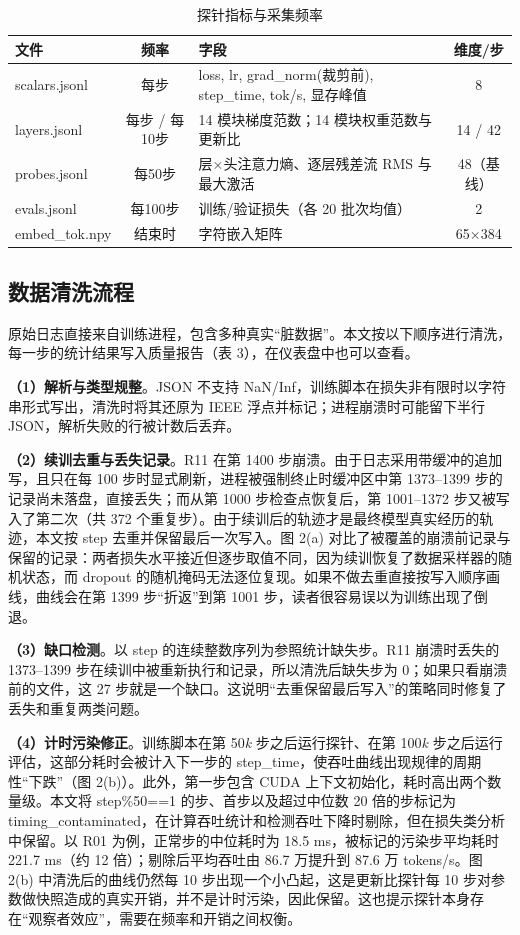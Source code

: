 \begin{table}[htbp]
\centering
\caption{探针指标与采集频率}
\small
\begin{tabularx}{\linewidth}{XcXc}
\toprule
\textbf{文件} & \textbf{频率} & \textbf{字段} & \textbf{维度/步} \\
\midrule
scalars.jsonl & 每步 & loss, lr, grad\_norm(裁剪前), step\_time, tok/s, 显存峰值 & 8 \\
layers.jsonl & 每步 / 每10步 & 14 模块梯度范数；14 模块权重范数与更新比 & 14 / 42 \\
probes.jsonl & 每50步 & 层$\times$头注意力熵、逐层残差流 RMS 与最大激活 & 48（基线） \\
evals.jsonl & 每100步 & 训练/验证损失（各 20 批次均值） & 2 \\
embed\_tok.npy & 结束时 & 字符嵌入矩阵 & 65$\times$384 \\
\bottomrule
\end{tabularx}
\end{table}

\subsection{数据清洗流程}

原始日志直接来自训练进程，包含多种真实“脏数据”。本文按以下顺序进行清洗，每一步的统计结果写入质量报告（表 3），在仪表盘中也可以查看。

\textbf{（1）解析与类型规整}。JSON 不支持 NaN/Inf，训练脚本在损失非有限时以字符串形式写出，清洗时将其还原为 IEEE 浮点并标记；进程崩溃时可能留下半行 JSON，解析失败的行被计数后丢弃。

\textbf{（2）续训去重与丢失记录}。R11 在第 1400 步崩溃。由于日志采用带缓冲的追加写，且只在每 100 步时显式刷新，进程被强制终止时缓冲区中第 1373–1399 步的记录尚未落盘，直接丢失；而从第 1000 步检查点恢复后，第 1001–1372 步又被写入了第二次（共 372 个重复步）。由于续训后的轨迹才是最终模型真实经历的轨迹，本文按 step 去重并保留最后一次写入。图 2(a) 对比了被覆盖的崩溃前记录与保留的记录：两者损失水平接近但逐步取值不同，因为续训恢复了数据采样器的随机状态，而 dropout 的随机掩码无法逐位复现。如果不做去重直接按写入顺序画线，曲线会在第 1399 步“折返”到第 1001 步，读者很容易误以为训练出现了倒退。

\textbf{（3）缺口检测}。以 step 的连续整数序列为参照统计缺失步。R11 崩溃时丢失的 1373–1399 步在续训中被重新执行和记录，所以清洗后缺失步为 0；如果只看崩溃前的文件，这 27 步就是一个缺口。这说明“去重保留最后写入”的策略同时修复了丢失和重复两类问题。

\textbf{（4）计时污染修正}。训练脚本在第 50\textit{k} 步之后运行探针、在第 100\textit{k} 步之后运行评估，这部分耗时会被计入下一步的 step\_time，使吞吐曲线出现规律的周期性“下跌”（图 2(b)）。此外，第一步包含 CUDA 上下文初始化，耗时高出两个数量级。本文将 step\%50==1 的步、首步以及超过中位数 20 倍的步标记为 timing\_contaminated，在计算吞吐统计和检测吞吐下降时剔除，但在损失类分析中保留。以 R01 为例，正常步的中位耗时为 18.5 ms，被标记的污染步平均耗时 221.7 ms（约 12 倍）；剔除后平均吞吐由 86.7 万提升到 87.6 万 tokens/s。图 2(b) 中清洗后的曲线仍然每 10 步出现一个小凸起，这是更新比探针每 10 步对参数做快照造成的真实开销，并不是计时污染，因此保留。这也提示探针本身存在“观察者效应”，需要在频率和开销之间权衡。


